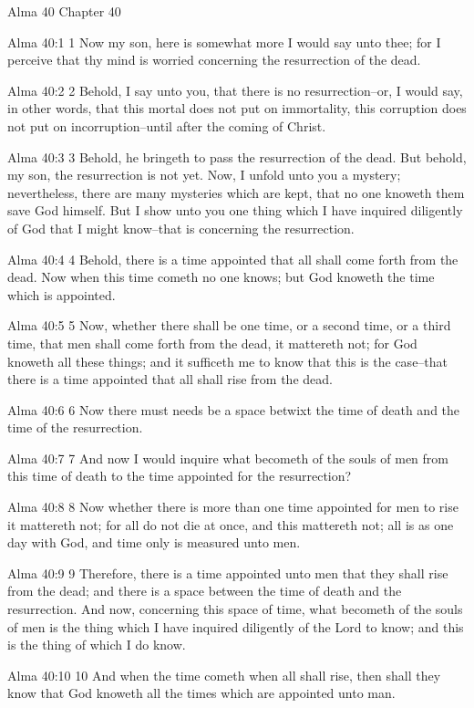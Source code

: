 Alma 40
Chapter 40

Alma 40:1
 1 Now my son, here is somewhat more I would say unto thee; for I
perceive that thy mind is worried concerning the resurrection of
the dead.

Alma 40:2
 2 Behold, I say unto you, that there is no resurrection--or, I
would say, in other words, that this mortal does not put on
immortality, this corruption does not put on incorruption--until
after the coming of Christ.

Alma 40:3
 3 Behold, he bringeth to pass the resurrection of the dead. But
behold, my son, the resurrection is not yet. Now, I unfold unto
you a mystery; nevertheless, there are many mysteries which are
kept, that no one knoweth them save God himself. But I show unto
you one thing which I have inquired diligently of God that I
might know--that is concerning the resurrection.

Alma 40:4
 4 Behold, there is a time appointed that all shall come forth
from the dead. Now when this time cometh no one knows; but God
knoweth the time which is appointed.

Alma 40:5
 5 Now, whether there shall be one time, or a second time, or a
third time, that men shall come forth from the dead, it mattereth
not; for God knoweth all these things; and it sufficeth me to
know that this is the case--that there is a time appointed that
all shall rise from the dead.

Alma 40:6
 6 Now there must needs be a space betwixt the time of death and
the time of the resurrection.

Alma 40:7
 7 And now I would inquire what becometh of the souls of men from
this time of death to the time appointed for the resurrection?

Alma 40:8
 8 Now whether there is more than one time appointed for men to
rise it mattereth not; for all do not die at once, and this
mattereth not; all is as one day with God, and time only is
measured unto men.

Alma 40:9
 9 Therefore, there is a time appointed unto men that they shall
rise from the dead; and there is a space between the time of
death and the resurrection. And now, concerning this space of
time, what becometh of the souls of men is the thing which I have
inquired diligently of the Lord to know; and this is the thing of
which I do know.

Alma 40:10
 10 And when the time cometh when all shall rise, then shall they
know that God knoweth all the times which are appointed unto man.

